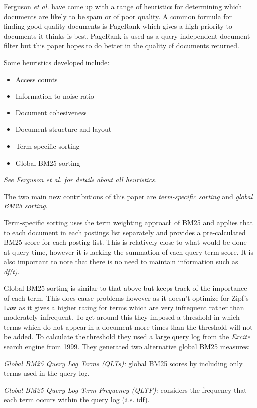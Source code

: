 \documentclass{acm_proc_article-sp}
\begin{document}
Ferguson \emph{et al.} have come up with a range of heuristics for determining which documents are likely to be spam or of poor quality. A common formula for finding good quality documents is PageRank which gives a high priority to documents it thinks is best. PageRank is used as a query-independent document filter but this paper hopes to do better in the quality of documents returned.

Some heuristics developed include:
\begin{itemize}
\item Access counts
\item Information-to-noise ratio
\item Document cohesiveness
\item Document structure and layout
\item Term-specific sorting
\item Global BM25 sorting
\end{itemize}
\emph{See Ferguson \emph{et al.} \cite{Ferguson:2012} for details about all heuristics.}

The two main new contributions of this paper are \emph{term-specific sorting} and \emph{global BM25 sorting}.

Term-specific sorting uses the term weighting approach of BM25 and applies that to each document in each postings list separately and provides a pre-calculated BM25 score for each posting list. This is relatively close to what would be done at query-time, however it is lacking the summation of each query term score. It is also important to note that there is no need to maintain information such as \emph{df(t)}.

Global BM25 sorting is similar to that above but keeps track of the importance of each term. This does cause problems however as it doesn't optimize for Zipf's Law as it gives a higher rating for terms which are very infrequent rather than moderately infrequent. To get around this they imposed a threshold in which terms which do not appear in a document more times than the threshold will not be added. To calculate the threshold they used a large query log from the \emph{Excite} search engine from 1999. They generated two alternative global BM25 measures:
 
\emph{Global BM25 Query Log Terms (QLTs):} global BM25 scores by including only terms used in the query log.

\emph{Global BM25 Query Log Term Frequency (QLTF):} considers the frequency that each term occurs within the query log (\emph{i.e.} idf).
\end{document}
